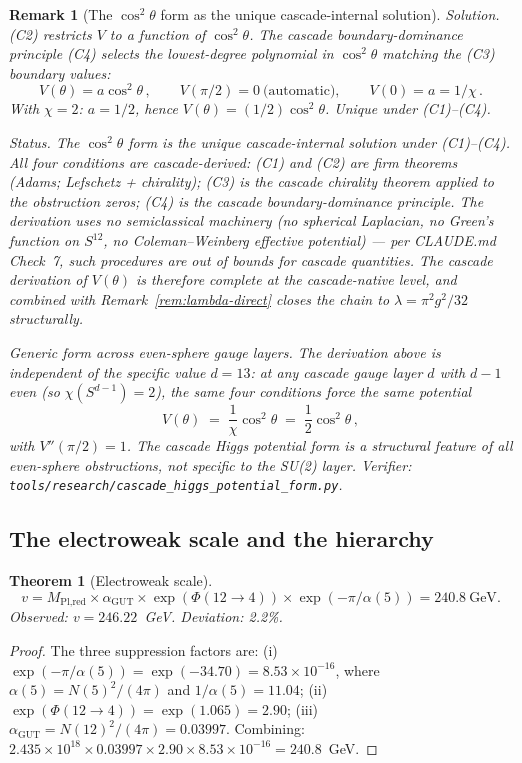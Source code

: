\documentclass[12pt,a4paper]{article}
\newtheorem{theorem}{Theorem}[section]
\newtheorem*{remark}{Remark}
\begin{document}
\begin{remark}[The $\cos^2\theta$ form as the unique cascade-internal solution]
\noindent\emph{Solution.} (C2) restricts $V$ to a function of $\cos^2\theta$. The cascade boundary-dominance principle (C4) selects the lowest-degree polynomial in $\cos^2\theta$ matching the (C3) boundary values:
\[
V(\theta) = a\cos^2\theta\,,\qquad V(\pi/2) = 0\ \text{(automatic)},\qquad V(0) = a = 1/\chi\,.
\]
With $\chi = 2$: $a = 1/2$, hence $V(\theta) = (1/2)\cos^2\theta$. \emph{Unique under (C1)--(C4).}

\medskip\noindent\emph{Status.} The $\cos^2\theta$ form is the unique cascade-internal solution under (C1)--(C4). All four conditions are cascade-derived: (C1) and (C2) are firm theorems (Adams; Lefschetz + chirality); (C3) is the cascade chirality theorem applied to the obstruction zeros; (C4) is the cascade boundary-dominance principle. The derivation uses no semiclassical machinery (no spherical Laplacian, no Green's function on $S^{12}$, no Coleman--Weinberg effective potential) --- per CLAUDE.md Check~7, such procedures are out of bounds for cascade quantities. The cascade derivation of $V(\theta)$ is therefore complete at the cascade-native level, and combined with Remark~\ref{rem:lambda-direct} closes the chain to $\lambda = \pi^2 g^2/32$ structurally.

\medskip\noindent\emph{Generic form across even-sphere gauge layers.} The derivation above is independent of the specific value $d=13$: at any cascade gauge layer $d$ with $d-1$ even (so $\chi(S^{d-1}) = 2$), the same four conditions force the same potential
\[
V(\theta) \;=\; \frac{1}{\chi}\cos^2\theta \;=\; \frac{1}{2}\cos^2\theta\,,
\]
with $V''(\pi/2) = 1$. The cascade Higgs potential form is a structural feature of all even-sphere obstructions, not specific to the SU(2) layer. Verifier: \texttt{tools/research/cascade\_higgs\_potential\_form.py}.
\end{remark}

\subsection{The electroweak scale and the hierarchy}

\begin{theorem}[Electroweak scale]\label{thm:vev}
\[
v = M_{\text{Pl,red}} \times \alpha_{\text{GUT}} \times \exp(\Phi(12 \to 4)) \times \exp(-\pi/\alpha(5)) = 240.8~\text{GeV}.
\]
Observed: $v = 246.22$~GeV. Deviation: 2.2\%.
\end{theorem}

\begin{proof}
The three suppression factors are: (i) $\exp(-\pi/\alpha(5)) = \exp(-34.70) = 8.53 \times 10^{-16}$, where $\alpha(5) = N(5)^2/(4\pi)$ and $1/\alpha(5) = 11.04$; (ii) $\exp(\Phi(12 \to 4)) = \exp(1.065) = 2.90$; (iii) $\alpha_{\text{GUT}} = N(12)^2/(4\pi) = 0.03997$. Combining: $2.435 \times 10^{18} \times 0.03997 \times 2.90 \times 8.53 \times 10^{-16} = 240.8$~GeV.
\end{proof}
\end{document}
